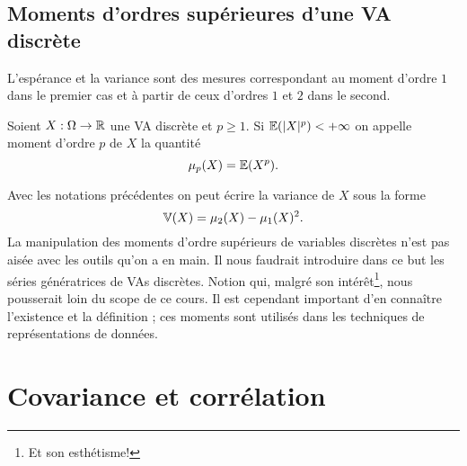 \documentclass[11pt, a4paper]{article}
\begin{document}
\subsection{Moments d'ordres supérieures d'une VA discrète}
\label{sec:momentsups}

L'espérance et la variance sont des mesures correspondant au moment
d'ordre $1$ dans le premier cas et à partir de ceux d'ordres $1$ et
$2$ dans le second.
\begin{defn}
  Soient $X : \Omega \to \mathbb{R}$ une VA discrète et $p \geq 1$. Si
  $\operatorname{\mathbb{E}}(|X|^p) < +\infty$ on appelle moment d'ordre $p$ de $X$ la
  quantité
  \[
    \mu_p(X) = \operatorname{\mathbb{E}}(X^p).
  \]
\end{defn}
Avec les notations précédentes on peut écrire la variance de $X$ sous
la forme
\[
  \operatorname{\mathbb{V}}(X) = \mu_2(X) - \mu_1(X)^2.
\]
La manipulation des moments d'ordre supérieurs de variables discrètes
n'est pas aisée avec les outils qu'on a en main. Il nous faudrait
introduire dans ce but les séries génératrices de VAs
discrètes. Notion qui, malgré son intérêt\footnote{Et son
  esthétisme!}, nous pousserait loin du scope de ce cours. Il est
cependant important d'en connaître l'existence et la définition ; ces
moments sont utilisés dans les techniques de représentations de
données.

\section{Covariance et corrélation}
\label{sec:convarianceetcorrelation}
\end{document}
